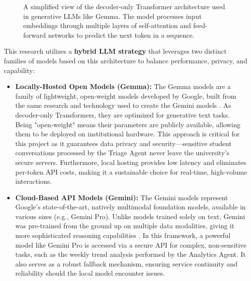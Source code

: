 \begin{figure}[htbp]
  \centering
  \caption{A simplified view of the decoder-only Transformer architecture used in generative LLMs like Gemma. The model processes input embeddings through multiple layers of self-attention and feed-forward networks to predict the next token in a sequence.}
  \label{fig:transformer_architecture}
\end{figure}

This research utilizes a \textbf{hybrid LLM strategy} that leverages two distinct families of models based on this architecture to balance performance, privacy, and capability:
\begin{itemize}
    \item \textbf{Locally-Hosted Open Models (Gemma):} The Gemma models are a family of lightweight, open-weight models developed by Google, built from the same research and technology used to create the Gemini models \cite{FIND_CITATION_PLEASE}. As decoder-only Transformers, they are optimized for generative text tasks. Being "open-weight" means their parameters are publicly available, allowing them to be deployed on institutional hardware. This approach is critical for this project as it guarantees data privacy and security—sensitive student conversations processed by the Triage Agent never leave the university's secure servers. Furthermore, local hosting provides low latency and eliminates per-token API costs, making it a sustainable choice for real-time, high-volume interactions.
    \item \textbf{Cloud-Based API Models (Gemini):} The Gemini models represent Google's state-of-the-art, natively multimodal foundation models, available in various sizes (e.g., Gemini Pro). Unlike models trained solely on text, Gemini was pre-trained from the ground up on multiple data modalities, giving it more sophisticated reasoning capabilities \cite{FIND_CITATION_PLEASE}. In this framework, a powerful model like Gemini Pro is accessed via a secure API for complex, non-sensitive tasks, such as the weekly trend analysis performed by the Analytics Agent. It also serves as a robust fallback mechanism, ensuring service continuity and reliability should the local model encounter issues.
\end{itemize}

